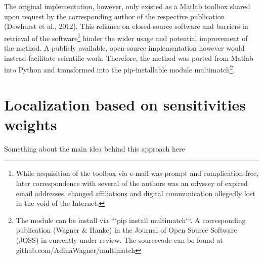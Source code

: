 \documentclass[a4paper, 11pt]{scrreprt}
\begin{document}
The original implementation, however, only existed as a Matlab toolbox shared upon request by the corresponding author of the respective publication (Dewhurst et al., 2012). This reliance on closed-source software and barriers in retrieval of the software\footnote{While acquisition of the toolbox via e-mail was prompt and complication-free, later correspondence with several of the authors was an odyssey of expired email addresses, changed affiliations and digital communication allegedly lost in the void of the Internet.} hinder the wider usage and potential improvement of the method. A publicly available, open-source implementation however would instead facilitate scientific work. Therefore, the method was ported from Matlab into Python and transformed into the pip-installable module multimatch\footnote{The module can be install via ```pip install multimatch```. A corresponding publication (Wagner \& Hanke) in the Journal of Open Source Software (JOSS) in currently under review. The sourcecode can be found at github.com/AdinaWagner/multimatch}.

\section{Localization based on sensitivities weights}
Something about the main idea behind this approach here
\end{document}

